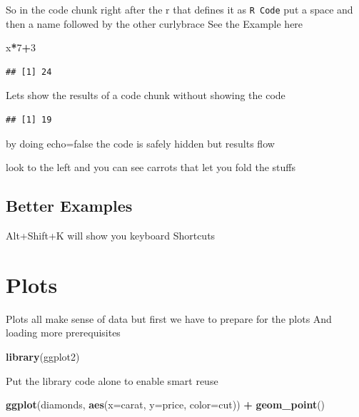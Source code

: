\documentclass[]{article}
\newenvironment{Shaded}{\begin{snugshade}}{\end{snugshade}}
\newcommand{\DataTypeTok}[1]{\textcolor[rgb]{0.13,0.29,0.53}{#1}}
\newcommand{\DecValTok}[1]{\textcolor[rgb]{0.00,0.00,0.81}{#1}}
\newcommand{\KeywordTok}[1]{\textcolor[rgb]{0.13,0.29,0.53}{\textbf{#1}}}
\newcommand{\NormalTok}[1]{#1}
\newcommand{\OperatorTok}[1]{\textcolor[rgb]{0.81,0.36,0.00}{\textbf{#1}}}
\newcommand{\StringTok}[1]{\textcolor[rgb]{0.31,0.60,0.02}{#1}}
\begin{document}
So in the code chunk right after the r that defines it as
\texttt{R\ Code} put a space and then a name followed by the other
curlybrace See the Example here

\begin{Shaded}
\begin{Highlighting}[]
\NormalTok{x}\OperatorTok{*}\DecValTok{7}\OperatorTok{+}\DecValTok{3}
\end{Highlighting}
\end{Shaded}

\begin{verbatim}
## [1] 24
\end{verbatim}

Lets show the results of a code chunk without showing the code

\begin{verbatim}
## [1] 19
\end{verbatim}

by doing echo=false the code is safely hidden but results flow

look to the left and you can see carrots that let you fold the stuffs

\hypertarget{better-examples}{%
\subsection{Better Examples}\label{better-examples}}

Alt+Shift+K will show you keyboard Shortcuts

\hypertarget{plots}{%
\section{Plots}\label{plots}}

Plots all make sense of data but first we have to prepare for the plots
And loading more prerequisites

\begin{Shaded}
\begin{Highlighting}[]
\KeywordTok{library}\NormalTok{(ggplot2)}
\end{Highlighting}
\end{Shaded}

Put the library code alone to enable smart reuse

\begin{Shaded}
\begin{Highlighting}[]
\KeywordTok{ggplot}\NormalTok{(diamonds, }\KeywordTok{aes}\NormalTok{(}\DataTypeTok{x=}\NormalTok{carat, }\DataTypeTok{y=}\NormalTok{price, }\DataTypeTok{color=}\NormalTok{cut)) }\OperatorTok{+}\StringTok{ }\KeywordTok{geom_point}\NormalTok{()}
\end{Highlighting}
\end{Shaded}
\end{document}
